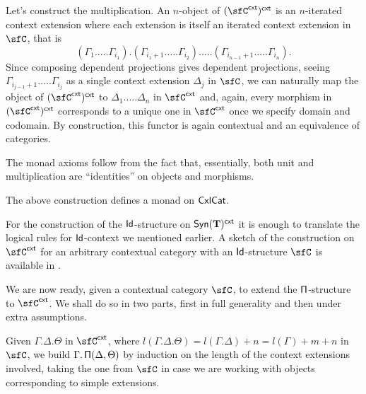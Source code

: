 \begin{construction}
  \noindent
  Let's construct the multiplication. An $n$-object of $(\sfC^{\cxt})^{\cxt}$ is an
  $n$-iterated context extension where each extension is itself an iterated
  context extension in $\sfC$, that is
  \[(\Gamma_1.\ldots.\Gamma_{i_1}).(\Gamma_{i_1+1}.\ldots.\Gamma_{i_2}).\ldots.(\Gamma_{i_{n-1}+1}.\ldots.\Gamma_{i_n}).\]
  Since composing dependent projections gives dependent projections,
  seeing $\Gamma_{i_{j-1}+1}.\ldots.\Gamma_{i_j}$ as a single context extension
  $\Delta_j$ in $\sfC$, we can naturally
  map the object of $(\sfC^{\cxt})^{\cxt}$ to $\Delta_1.\ldots.\Delta_n$ in
  $\sfC^{\cxt}$ and, again, every morphism
  in $(\sfC^{\cxt})^{\cxt}$ corresponds to a unique one in $\sfC^{\cxt}$ once we
  specify domain and codomain. By construction, this functor is again contextual
  and an equivalence of categories.

  \noindent
  The monad axioms follow from the fact that, essentially, both unit and
  multiplication are ``identities'' on objects and morphisms.
\end{construction}

\begin{prop}
  The above construction defines a monad on $\operatorname{\mathsf{CxlCat}}$.
\end{prop}

  \noindent
For the construction of the $\operatorname{\mathsf{Id}}$-structure on $\mathsf{Syn}(\mathbf{T})^{\operatorname{\mathsf{cxt}}}$ it is
enough to translate the logical rules for $\operatorname{\mathsf{Id}}$-context we mentioned earlier. A
sketch of the construction on $\sfC^{\cxt}$ for an
arbitrary contextual category with an $\operatorname{\mathsf{Id}}$-structure $\sfC$ is available in
\cite[Constr.\ 2.17]{KS19}.

  \noindent
We are now ready, given a contextual category $\sfC$, to extend the
$\operatorname{\mathsf{\Pi}}$-structure to $\sfC^{\cxt}$. We shall do so in two parts, first in full
generality and then under extra assumptions.

  \noindent
Given $\Gamma.\Delta.\Theta$ in $\sfC^{\cxt}$, where
$l(\Gamma.\Delta.\Theta)=l(\Gamma.\Delta)+n=l(\Gamma)+m+n$ in $\sfC$, we
build $\Gamma.\operatorname{\mathsf{\Pi}}(\Delta,\Theta)$ by induction on the length of the context
extensions involved, taking the
one from $\sfC$ in case we are working with objects corresponding to simple
extensions.

